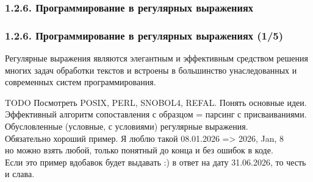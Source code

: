 \documentclass[mathserif,12pt,aspectratio=169]{beamer}
\renewcommand{\index}[1]{}
\def\odmkey#1#2{{\it\color{red} #1}\index{#2}}
\def\TODO#1{{\color{gray} TODO {#1}}}
\begin{document}
%

\subsubsection{1.2.6. Программирование в регулярных выражениях}
\label{1.2.6.}

\begin{frame}
\frametitle{1.2.6. Программирование в регулярных выражениях (1/5)}
Регулярные выражения являются элегантным и эффективным средством
решения многих задач обработки текстов и встроены в большинство
унаследованных и современных систем программирования.

\bigskip 
\TODO{Посмотреть POSIX, PERL, SNOBOL4, REFAL. Понять основные идеи. \\
Эффективный алгоритм сопоставления с образцом = парсинг с присваиваниями. \\
Обусловленные (условные, с условиями) регулярные выражения. \\
Обязательно хороший пример. Я люблю такой 08.01.2026 => 2026, Jan, 8 \\ 
но можно взять любой, только понятный до конца и без ошибок в коде.\\
Если это пример вдобавок будет выдавать :) в ответ на дату 31.06.2026, то честь и слава. }

\end{frame}
\end{document}
